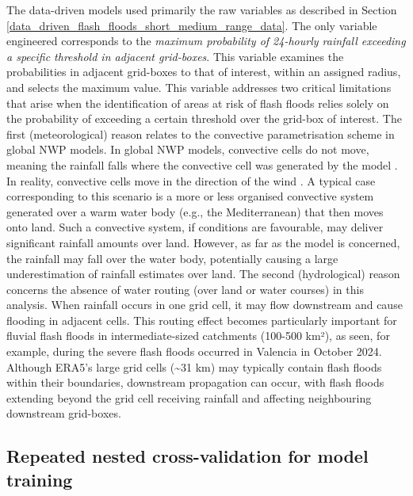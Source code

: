 The data-driven models used primarily the raw variables as described in Section \ref{data_driven_flash_floods_short_medium_range_data}. The only variable engineered corresponds to the \textit{maximum probability of 24-hourly rainfall exceeding a specific threshold in adjacent grid-boxes}. This variable examines the probabilities in adjacent grid-boxes to that of interest, within an assigned radius, and selects the maximum value. This variable addresses two critical limitations that arise when the identification of areas at risk of flash floods relies solely on the probability of exceeding a certain threshold over the grid-box of interest. The first (meteorological) reason relates to the convective parametrisation scheme in global NWP models. In global NWP models, convective cells do not move, meaning the rainfall falls where the convective cell was generated by the model \citep{Doswell_2001}. In reality, convective cells move in the direction of the wind \citep{Doswell_2001}. A typical case corresponding to this scenario is a more or less organised convective system generated over a warm water body (e.g., the Mediterranean) that then moves onto land. Such a convective system, if conditions are favourable, may deliver significant rainfall amounts over land. However, as far as the model is concerned, the rainfall may fall over the water body, potentially causing a large underestimation of rainfall estimates over land. The second (hydrological) reason concerns the absence of water routing (over land or water courses) in this analysis. When rainfall occurs in one grid cell, it may flow downstream and cause flooding in adjacent cells. This routing effect becomes particularly important for fluvial flash floods in intermediate-sized catchments (100-500 km²), as seen, for example, during the severe flash floods occurred in Valencia in October 2024. Although ERA5's large grid cells (\sim31 km) may typically contain flash floods within their boundaries, downstream propagation can occur, with flash floods extending beyond the grid cell receiving rainfall and affecting neighbouring downstream grid-boxes.


\subsection{Repeated nested cross-validation for model training}

